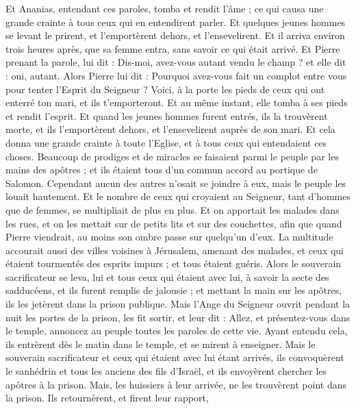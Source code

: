 \begin{multicols}{2}
{Et Ananias, entendant ces paroles, tomba et rendit l'âme ; ce qui causa une grande crainte à tous ceux qui en entendirent parler.
Et quelques jeunes hommes se levant le prirent, et l'emportèrent dehors, et l'ensevelirent.
Et il arriva environ trois heures après, que sa femme entra, sans savoir ce qui était arrivé.
Et Pierre prenant la parole, lui dit : Dis-moi, avez-vous autant vendu le champ ? et elle dit : oui, autant.
Alors Pierre lui dit : Pourquoi avez-vous fait un complot entre vous pour tenter l'Esprit du Seigneur ? Voici, à la porte les pieds de ceux qui ont enterré ton mari, et ils t'emporteront.
Et au même instant, elle tomba à ses pieds et rendit l'esprit. Et quand les jeunes hommes furent entrés, ils la trouvèrent morte, et ils l'emportèrent dehors, et l'ensevelirent auprès de son mari.
Et cela donna une grande crainte à toute l'Eglise, et à tous ceux qui entendaient ces choses.
Beaucoup de prodiges et de miracles se faisaient parmi le peuple par les mains des apôtres ; et ils étaient tous d'un commun accord au portique de Salomon.
Cependant aucun des autres n'osait se joindre à eux, mais le peuple les louait hautement.
Et le nombre de ceux qui croyaient au Seigneur, tant d'hommes que de femmes, se multipliait de plus en plus.
Et on apportait les malades dans les rues, et on les mettait sur de petits lits et sur des couchettes, afin que quand Pierre viendrait, au moins son ombre passe sur quelqu'un d'eux.
La multitude accourait aussi des villes voisines à Jérusalem, amenant des malades, et ceux qui étaient tourmentés des esprits impurs ; et tous étaient guéris.
Alors le souverain sacrificateur se leva, lui et tous ceux qui étaient avec lui, à savoir la secte des sadducéens, et ils furent remplis de jalousie ;
et mettant la main sur les apôtres, ils les jetèrent dans la prison publique.
Mais l'Ange du Seigneur ouvrit pendant la nuit les portes de la prison, les fit sortir, et leur dit :
Allez, et présentez-vous dans le temple, annoncez au peuple toutes les paroles de cette vie.
Ayant entendu cela, ils entrèrent dès le matin dans le temple, et se mirent à enseigner. Mais le souverain sacrificateur et ceux qui étaient avec lui étant arrivés, ils convoquèrent le sanhédrin et tous les anciens des fils d'Israël, et ils envoyèrent chercher les apôtres à la prison.
Mais, les huissiers à leur arrivée, ne les trouvèrent point dans la prison. Ils retournèrent, et firent leur rapport,
}
\end{multicols}
